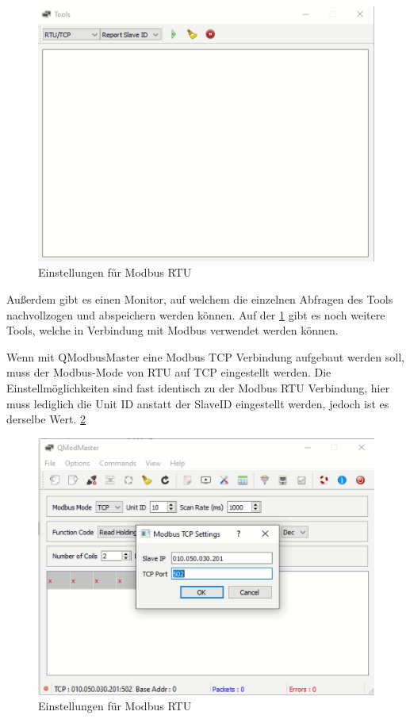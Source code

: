 \begin{figure}[h t]
\centering
\includegraphics[scale=0.7]{pics/ToolsQModbusMaster.png}
\caption{Einstellungen für Modbus RTU}
\label{fig:impl:ToolsQModbusMaster}
\end{figure}


Außerdem gibt es einen Monitor, auf welchem die einzelnen Abfragen des Tools nachvollzogen und abspeichern werden können. Auf der \ref{fig:impl:ToolsQModbusMaster} gibt es noch weitere Tools, welche in Verbindung mit Modbus verwendet werden können.



Wenn mit QModbusMaster eine Modbus TCP Verbindung aufgebaut werden soll, muss der Modbus-Mode von RTU auf TCP eingestellt werden. Die Einstellmöglichkeiten sind fast identisch zu der Modbus RTU Verbindung, hier muss lediglich die Unit ID anstatt der SlaveID eingestellt werden, jedoch ist es derselbe Wert. \ref{fig:impl:QmodbusMasterTCP}


\begin{figure}[h t]
\centering
\includegraphics[scale=0.7]{pics/QmodbusMasterTCP setting.png}
\caption{Einstellungen für Modbus RTU}
\label{fig:impl:QmodbusMasterTCP}
\end{figure}


